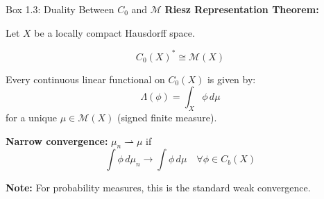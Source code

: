 \documentclass[aspectratio=169]{beamer}
\newcommand{\Mm}{\mathcal{M}}
\newcommand{\Cb}{C_b}
\newcommand{\Czero}{C_0}
\begin{document}
\begin{frame}{Box 1.3: Duality Between $C_0$ and $\mathcal{M}$}
\textbf{Riesz Representation Theorem:}

Let $X$ be a locally compact Hausdorff space.

\vspace{0.3cm}
\[
\boxed{\Czero(X)^* \cong \Mm(X)}
\]

\vspace{0.3cm}
Every continuous linear functional on $\Czero(X)$ is given by:
\[
\Lambda(\phi) = \int_X \phi \, d\mu
\]
for a unique $\mu \in \Mm(X)$ (signed finite measure).

\vspace{0.4cm}
\textbf{Narrow convergence:} $\mu_n \rightharpoonup \mu$ if
\[
\int \phi \, d\mu_n \to \int \phi \, d\mu \quad \forall \phi \in \Cb(X)
\]

\vspace{0.2cm}
\textbf{Note:} For probability measures, this is the standard weak convergence.
\end{frame}
\end{document}
